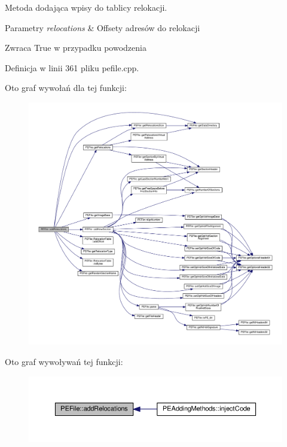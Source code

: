 Metoda dodająca wpisy do tablicy relokacji. 


\begin{DoxyParams}{Parametry}
{\em relocations} & Offsety adresów do relokacji \\
\hline
\end{DoxyParams}
\begin{DoxyReturn}{Zwraca}
True w przypadku powodzenia 
\end{DoxyReturn}


Definicja w linii 361 pliku pefile.\-cpp.



Oto graf wywołań dla tej funkcji\-:
\nopagebreak
\begin{figure}[H]
\begin{center}
\leavevmode
\includegraphics[width=350pt]{class_p_e_file_ab6f1b8483aeba41b153aa27e9c6a0b8b_cgraph}
\end{center}
\end{figure}




Oto graf wywoływań tej funkcji\-:
\nopagebreak
\begin{figure}[H]
\begin{center}
\leavevmode
\includegraphics[width=350pt]{class_p_e_file_ab6f1b8483aeba41b153aa27e9c6a0b8b_icgraph}
\end{center}
\end{figure}


